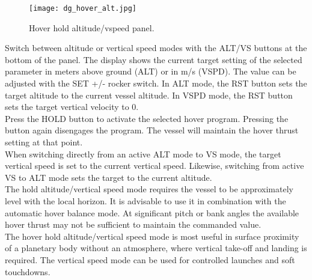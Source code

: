 \documentclass[Orbiter User Manual.tex]{subfiles}
\begin{document}
\begin{figure}[H]
  \centering
  \texttt{[image: dg\_hover\_alt.jpg]}
  \caption{Hover hold altitude/vspeed panel.}
\end{figure}

\noindent
Switch between altitude or vertical speed modes with the ALT/VS buttons at the bottom of the panel. The display shows the current target setting of the selected parameter in meters above ground (ALT) or in m/s (VSPD). The value can be adjusted with the SET +/- rocker switch. In ALT mode, the RST button sets the target altitude to the current vessel altitude. In VSPD mode, the RST button sets the target vertical velocity to 0.\\
Press the HOLD button to activate the selected hover program. Pressing the button again disengages the program. The vessel will maintain the hover thrust setting at that point.\\
When switching directly from an active ALT mode to VS mode, the target vertical speed is set to the current vertical speed. Likewise, switching from active VS to ALT mode sets the target to the current altitude.\\
The hold altitude/vertical speed mode requires the vessel to be approximately level with the local horizon. It is advisable to use it in combination with the automatic hover balance mode. At significant pitch or bank angles the available hover thrust may not be sufficient to maintain the commanded value.\\
The hover hold altitude/vertical speed mode is most useful in surface proximity of a planetary body without an atmosphere, where vertical take-off and landing is required. The vertical speed mode can be used for controlled launches and soft touchdowns.
\end{document}
